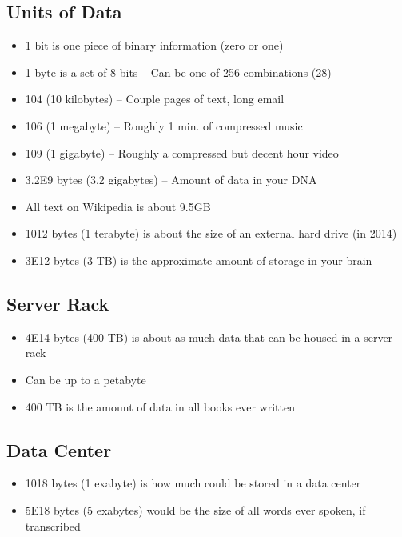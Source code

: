 \documentclass[
]{book}
\providecommand{\tightlist}{%
  \setlength{\itemsep}{0pt}\setlength{\parskip}{0pt}}
\begin{document}
\subsection{Units of Data}\label{units-of-data}

\begin{itemize}
\tightlist
\item
  1 bit is one piece of binary information (zero or one)
\item
  1 byte is a set of 8 bits -- Can be one of 256 combinations (28)
\item
  104 (10 kilobytes) -- Couple pages of text, long email
\item
  106 (1 megabyte) -- Roughly 1 min. of compressed music
\item
  109 (1 gigabyte) -- Roughly a compressed but decent hour video
\item
  3.2E9 bytes (3.2 gigabytes) -- Amount of data in your DNA
\item
  All text on Wikipedia is about 9.5GB
\item
  1012 bytes (1 terabyte) is about the size of an external hard drive (in 2014)
\item
  3E12 bytes (3 TB) is the approximate amount of storage in your brain
\end{itemize}

\subsection{Server Rack}\label{server-rack}

\begin{itemize}
\tightlist
\item
  4E14 bytes (400 TB) is about as much data that can be housed in a server rack
\item
  Can be up to a petabyte
\item
  400 TB is the amount of data in all books ever written
\end{itemize}

\subsection{Data Center}\label{data-center}

\begin{itemize}
\tightlist
\item
  1018 bytes (1 exabyte) is how much could be stored in a data center
\item
  5E18 bytes (5 exabytes) would be the size of all words ever spoken, if transcribed
\end{itemize}
\end{document}
